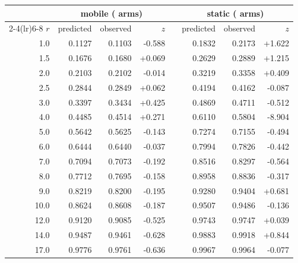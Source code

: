 \begin{center}
\small
\begin{tabular}{rrrrrrrr}
\toprule
& \multicolumn{3}{c}{mobile (\radialProfileMobileArms{} arms)} & & \multicolumn{3}{c}{static (\radialProfileStaticArms{} arms)} \\
\cmidrule(lr){2-4}\cmidrule(lr){6-8}
$r$ & predicted & observed & $z$ & & predicted & observed & $z$ \\ \midrule
1.0 & 0.1127 & 0.1103 & -0.588 & & 0.1832 & 0.2173 & +1.622 \\
1.5 & 0.1676 & 0.1680 & +0.069 & & 0.2629 & 0.2889 & +1.215 \\
2.0 & 0.2103 & 0.2102 & -0.014 & & 0.3219 & 0.3358 & +0.409 \\
2.5 & 0.2844 & 0.2849 & +0.062 & & 0.4194 & 0.4162 & -0.087 \\
3.0 & 0.3397 & 0.3434 & +0.425 & & 0.4869 & 0.4711 & -0.512 \\
4.0 & 0.4485 & 0.4514 & +0.271 & & 0.6110 & 0.5804 & -8.904 \\
5.0 & 0.5642 & 0.5625 & -0.143 & & 0.7274 & 0.7155 & -0.494 \\
6.0 & 0.6444 & 0.6440 & -0.037 & & 0.7994 & 0.7826 & -0.442 \\
7.0 & 0.7094 & 0.7073 & -0.192 & & 0.8516 & 0.8297 & -0.564 \\
8.0 & 0.7712 & 0.7695 & -0.158 & & 0.8958 & 0.8836 & -0.317 \\
9.0 & 0.8219 & 0.8200 & -0.195 & & 0.9280 & 0.9404 & +0.681 \\
10.0 & 0.8624 & 0.8608 & -0.187 & & 0.9507 & 0.9486 & -0.136 \\
12.0 & 0.9120 & 0.9085 & -0.525 & & 0.9743 & 0.9747 & +0.039 \\
14.0 & 0.9487 & 0.9461 & -0.628 & & 0.9883 & 0.9918 & +0.844 \\
17.0 & 0.9776 & 0.9761 & -0.636 & & 0.9967 & 0.9964 & -0.077 \\
\bottomrule
\end{tabular}
\end{center}
